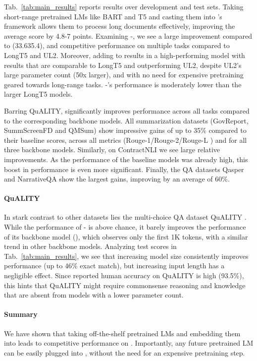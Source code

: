Tab.~\ref{tab:main_results} reports results over \SCROLLS{} development and test sets.
Taking short-range pretrained LMs like BART and T5 and casting them into \sled{}'s framework allows them to process long documents effectively, improving the average \SCROLLS{} score by 4.8-7 points.
Examining \bartbase{}-\sled{}, we see a large improvement compared to \ledbase{} (33.635.4), and competitive performance on multiple tasks compared to LongT5 and UL2.
Moreover, adding \sled{} to \bartlarge{}
results in a high-performing model
with results that are comparable to LongT5 and outperforming UL2, despite UL2's large parameter count (50x larger), and with no need for expensive pretraining geared towards long-range tasks. \bartlarge{}-\sled{}'s performance is moderately lower than the larger LongT5 models.


Barring QuALITY, \sled{} significantly improves performance across all tasks compared to the corresponding backbone models.
All summarization datasets (GovReport, SummScreenFD and QMSum) show impressive gains of up to 35\% compared to their baseline scores, across all metrics (Rouge-1/Rouge-2/Rouge-L \cite{Lin2004ROUGEAP}) and for all three backbone models. 
Similarly, on ContractNLI \cite{koreeda-manning-2021-contractnli-dataset} we see large relative improvements. As the performance of the baseline models was already high, this boost in performance is even more significant.
Finally, the QA datasets Qasper and NarrativeQA show the largest gains, improving by an average of 60\%.


\paragraph{QuALITY} In stark contrast to other datasets lies the multi-choice QA dataset QuALITY \cite{pang2021quality}. While the performance of \bartlarge{}-\sled{} is above chance, it barely improves the performance of its backbone model (\bartlarge{}), which observes only the first 1K tokens, with a similar trend in other backbone models. Analyzing test scores in Tab.~\ref{tab:main_results}, we see  that
increasing model size consistently improves performance (up to 46\% exact match), but increasing input length has a negligible effect. 
Since reported human accuracy on QuALITY is high (93.5\%), this hints that QuALITY might require commonsense reasoning and knowledge that are absent from models with a lower parameter count.

\paragraph{Summary}
We have shown that taking off-the-shelf pretrained LMs and embedding them into \sled{} leads to competitive performance on \SCROLLS{}. Importantly, any future pretrained LM can be easily plugged into \sled{}, without the need for an expensive pretraining step.


